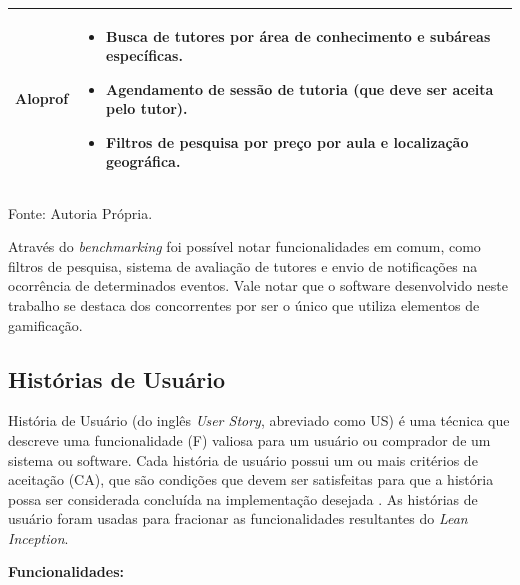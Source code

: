 \begin{table}[h!]
\begin{tabularx}{\linewidth}{|l|X|}
        \\
        \hline
        Aloprof &
        \begin{itemize}[nosep, leftmargin=*, after=\vspace{\baselineskip}]
            \item Busca de tutores por área de conhecimento e subáreas específicas.
            \item Agendamento de sessão de tutoria (que deve ser aceita pelo tutor).
            \item Filtros de pesquisa por preço por aula e localização geográfica.
        \end{itemize}  
        \\
        \hline
    \end{tabularx}
    \vspace{0.1cm}
    
     Fonte: Autoria Própria.
\end{table}

Através do \textit{benchmarking} foi possível notar funcionalidades em comum, como filtros de pesquisa, sistema de avaliação de tutores e envio de notificações na ocorrência de determinados eventos. Vale notar que o software desenvolvido neste trabalho se destaca dos concorrentes por ser o único que utiliza elementos de gamificação.

\subsection[Histórias de Usuário]{Histórias de Usuário}
\label{historias-usuario}

História de Usuário (do inglês \textit{User Story}, abreviado como US) é uma técnica que
descreve uma funcionalidade (F) valiosa para um usuário ou comprador de um sistema ou software. Cada história de usuário possui um ou mais critérios de aceitação (CA), que são condições que devem ser satisfeitas para que a história possa ser considerada concluída na implementação desejada \cite{cohn2004user}. As histórias de usuário foram usadas para fracionar as funcionalidades resultantes do \textit{Lean Inception}.

\newpage

\textbf{Funcionalidades:}

